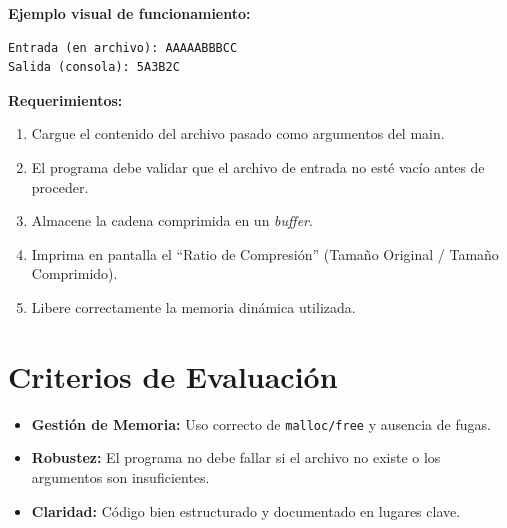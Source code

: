 \documentclass[12pt,a4paper]{article}
\begin{document}
\textbf{Ejemplo visual de funcionamiento:}
\begin{lstlisting}[numbers=none]
Entrada (en archivo): AAAAABBBCC
Salida (consola): 5A3B2C
\end{lstlisting}

\textbf{Requerimientos:}
\begin{enumerate}
    \item Cargue el contenido del archivo pasado como argumentos del main.
    \item El programa debe validar que el archivo de entrada no esté vacío antes de proceder.
    \item Almacene la cadena comprimida en un \textit{buffer}.
    \item Imprima en pantalla el ``Ratio de Compresión'' (Tamaño Original / Tamaño Comprimido).
    \item Libere correctamente la memoria dinámica utilizada.
\end{enumerate}

\section*{Criterios de Evaluación}
\begin{itemize}
    \item \textbf{Gestión de Memoria:} Uso correcto de \texttt{malloc/free} y ausencia de fugas.
    \item \textbf{Robustez:} El programa no debe fallar si el archivo no existe o los argumentos son insuficientes.
    \item \textbf{Claridad:} Código bien estructurado y documentado en lugares clave.
\end{itemize}
\end{document}
